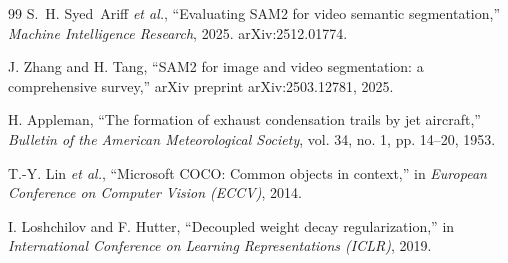 \documentclass[review]{elsarticle}
\begin{document}
\begin{thebibliography}{99}
S.~H. Syed~Ariff \textit{et al.}, ``Evaluating SAM2 for video semantic segmentation,'' \textit{Machine Intelligence Research}, 2025. arXiv:2512.01774.

J. Zhang and H. Tang, ``SAM2 for image and video segmentation: a comprehensive survey,'' arXiv preprint arXiv:2503.12781, 2025.

H. Appleman, ``The formation of exhaust condensation trails by jet aircraft,'' \textit{Bulletin of the American Meteorological Society}, vol. 34, no. 1, pp. 14--20, 1953.

T.-Y. Lin \textit{et al.}, ``Microsoft COCO: Common objects in context,'' in \textit{European Conference on Computer Vision (ECCV)}, 2014.

I. Loshchilov and F. Hutter, ``Decoupled weight decay regularization,'' in \textit{International Conference on Learning Representations (ICLR)}, 2019.

\end{thebibliography}
\end{document}
